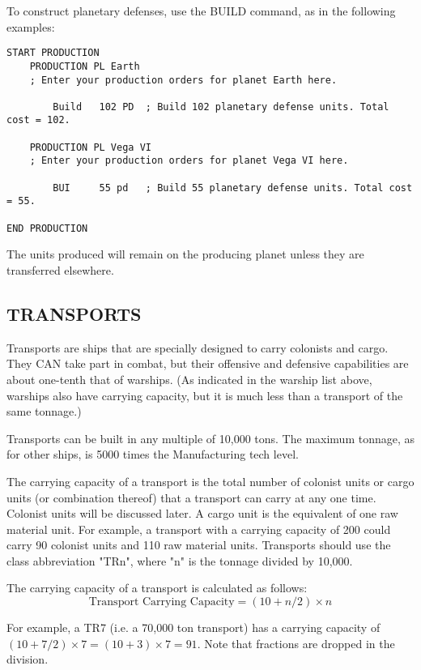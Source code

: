 \documentclass[10pt,titlepage]{article}
\begin{document}
To construct planetary defenses, use the BUILD command, as in the following
examples:
\begin{verbatim}
START PRODUCTION
    PRODUCTION PL Earth
    ; Enter your production orders for planet Earth here.

        Build   102 PD  ; Build 102 planetary defense units. Total cost = 102.

    PRODUCTION PL Vega VI
    ; Enter your production orders for planet Vega VI here.

        BUI     55 pd   ; Build 55 planetary defense units. Total cost = 55.

END PRODUCTION
\end{verbatim}
The units produced will remain on the producing planet unless they are
transferred elsewhere.


\subsection{TRANSPORTS}
\label{sec:transports}

Transports are ships that are specially designed to carry colonists and cargo.
They CAN take part in combat, but their offensive and defensive capabilities
are about one-tenth that of warships.  (As indicated in the warship list above,
warships also have carrying capacity, but it is much less than a transport of
the same tonnage.)

Transports can be built in any multiple of 10,000 tons.  The maximum tonnage,
as for other ships, is 5000 times the Manufacturing tech level.

The carrying capacity of a transport is the total number of colonist units or
cargo units (or combination thereof) that a transport can carry at any one
time.  Colonist units will be discussed later.  A cargo unit is the equivalent
of one raw material unit.  For example, a transport with a carrying capacity
of 200 could carry 90 colonist units and 110 raw material units.  Transports
should use the class abbreviation "TRn", where "n" is the tonnage divided by
10,000.

The carrying capacity of a transport is calculated as follows:
\begin{equation*}
	\textrm{Transport Carrying Capacity}  =  (10 + n/2) \times n
\end{equation*}

For example, a TR7 (i.e. a 70,000 ton transport) has a carrying capacity of
$(10 + 7/2) \times 7 = (10 + 3) \times 7 = 91$.  Note that fractions are dropped in the
division.
\end{document}
